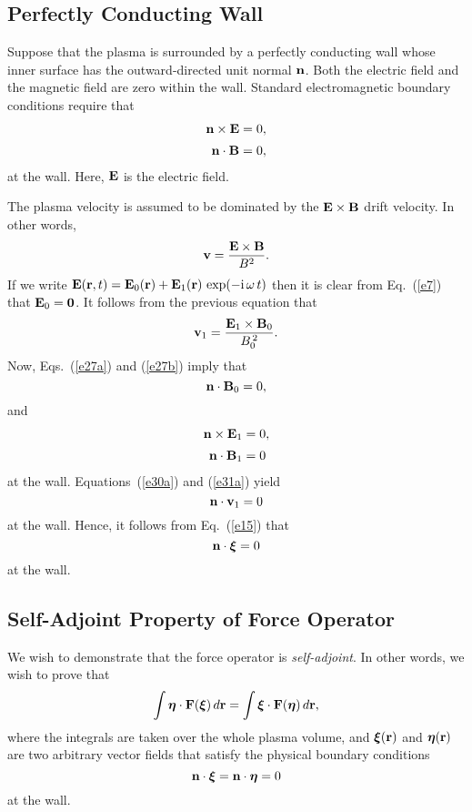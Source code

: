 \documentclass[12pt,prb,aps,notitlepage]{revtex4-1}
\newcommand{\bxi}{\mbox{\boldmath$\xi$}}
\newcommand{\bta}{\mbox{\boldmath$\eta$}}
\begin{document}
\subsection{Perfectly Conducting Wall}
Suppose that the plasma is surrounded by a perfectly conducting wall whose inner surface has the outward-directed unit normal  ${\bf n}$. 
Both the electric field and the magnetic field are zero within the wall. Standard electromagnetic boundary conditions 
require that
\begin{align}\label{e27a}
{\bf n}\times {\bf E}&= 0,\\[0.5ex]
{\bf n} \cdot {\bf B}&=0,\label{e27b}
\end{align}
at the wall. Here, ${\bf E}$ is the electric field. 

The plasma velocity is assumed to be dominated by the ${\bf E}\times {\bf B}$ drift velocity. In other words,
\begin{equation}
{\bf v} = \frac{{\bf E}\times {\bf B}}{B^2}.
\end{equation}
If we write ${\bf E}({\bf r},t)= {\bf E}_0({\bf r})+ {\bf E}_1({\bf r})\,\exp(-{\rm i}\,\omega\,t)$
then it is clear from Eq.~(\ref{e7}) that ${\bf E}_0={\bf 0}$. It follows from the previous equation that
\begin{equation}\label{e30a}
{\bf v}_1 = \frac{{\bf E}_1\times {\bf B}_0}{B_0^{\,2}}.
\end{equation}
Now, Eqs.~(\ref{e27a}) and (\ref{e27b}) imply that
\begin{equation}\label{e31x}
{\bf n} \cdot {\bf B}_0=0,
\end{equation}
and 
\begin{align}
{\bf n}\times {\bf E}_1&= 0,\label{e31a}\\[0.5ex]
{\bf n} \cdot {\bf B}_1&=0\label{e33}
\end{align}
at the wall. 
Equations~(\ref{e30a}) and (\ref{e31a}) yield
\begin{equation}
{\bf n}\cdot{\bf v}_1=0
\end{equation}
at the wall. Hence, it follows from Eq.~(\ref{e15}) that
\begin{equation}\label{e35}
{\bf n}\cdot\bxi = 0
\end{equation}
at the wall. 

\subsection{Self-Adjoint Property of Force Operator}
We wish to demonstrate that the force operator is {\em self-adjoint}. In other words, we wish to prove that 
\begin{equation}\label{e26}
\int \bta\cdot{\bf F}(\bxi)\,d{\bf r} = \int \bxi\cdot {\bf F}(\bta)\,d{\bf r},
\end{equation}
where the integrals are taken over the whole plasma volume, and  $\bxi({\bf r})$ and $\bta({\bf r})$ are two arbitrary vector fields that satisfy the 
physical boundary conditions
\begin{equation}\label{e27}
{\bf n}\cdot\bxi={\bf n}\cdot\bta=0
\end{equation}
at the wall.
\end{document}
